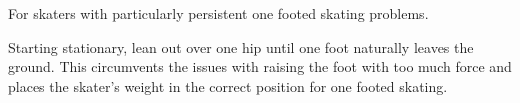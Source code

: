 For skaters with particularly persistent one footed skating problems. 


Starting stationary, lean out over one hip until one foot naturally leaves the ground.  
This circumvents the issues with raising the foot with too much force and places the skater's weight in the correct position for one footed skating.    
